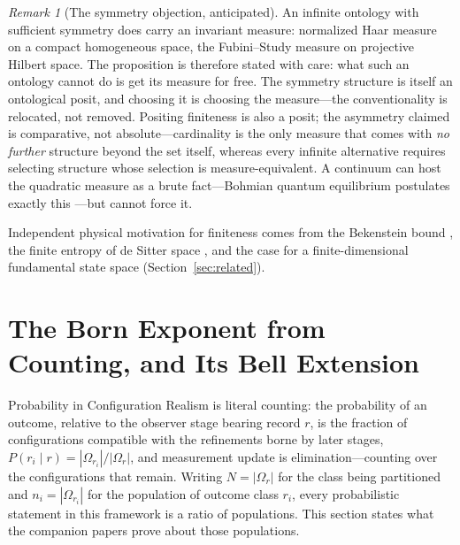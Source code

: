 \documentclass[11pt]{article}
\theoremstyle{definition}
\theoremstyle{remark}
\newtheorem{remark}{Remark}
\begin{document}
\begin{remark}[The symmetry objection, anticipated]\label{rem:haar}
An infinite ontology with sufficient symmetry does carry an invariant measure: normalized Haar measure on a compact homogeneous space, the Fubini--Study measure on projective Hilbert space. The proposition is therefore stated with care: what such an ontology cannot do is get its measure for free. The symmetry structure is itself an ontological posit, and choosing it is choosing the measure---the conventionality is relocated, not removed. Positing finiteness is also a posit; the asymmetry claimed is comparative, not absolute---cardinality is the only measure that comes with \emph{no further} structure beyond the set itself, whereas every infinite alternative requires selecting structure whose selection is measure-equivalent. A continuum can host the quadratic measure as a brute fact---Bohmian quantum equilibrium postulates exactly this \cite{Durr1992}---but cannot force it.
\end{remark}

Independent physical motivation for finiteness comes from the Bekenstein bound \cite{Bekenstein1981}, the finite entropy of de Sitter space \cite{Banks2001}, and the case for a finite-dimensional fundamental state space \cite{CarrollSingh2018} (Section~\ref{sec:related}).

\section{The Born Exponent from Counting, and Its Bell Extension}\label{sec:born}
Probability in Configuration Realism is literal counting: the probability of an outcome, relative to the observer stage bearing record $r$, is the fraction of configurations compatible with the refinements borne by later stages, $P(r_i \mid r) = |\Omega_{r_i}|/|\Omega_r|$, and measurement update is elimination---counting over the configurations that remain. Writing $N = |\Omega_r|$ for the class being partitioned and $n_i = |\Omega_{r_i}|$ for the population of outcome class $r_i$, every probabilistic statement in this framework is a ratio of populations. This section states what the companion papers prove about those populations.
\end{document}
